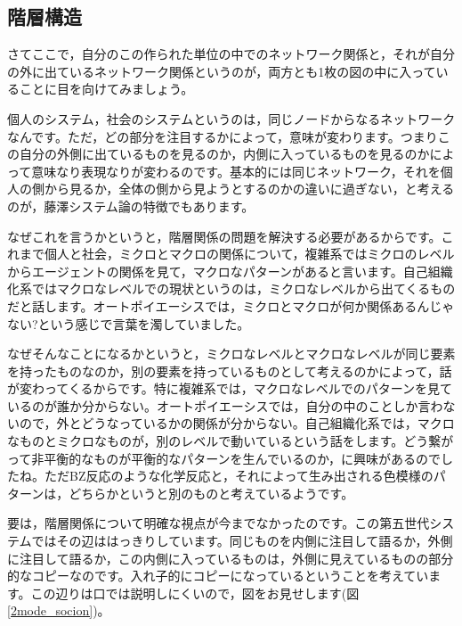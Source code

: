 \documentclass{ltjsbook}
\begin{document}
\subsection{階層構造}

さてここで，自分のこの作られた単位の中でのネットワーク関係と，それが自分の外に出ているネットワーク関係というのが，両方とも1枚の図の中に入っていることに目を向けてみましょう。

個人のシステム，社会のシステムというのは，同じノードからなるネットワークなんです。ただ，どの部分を注目するかによって，意味が変わります。つまりこの自分の外側に出ているものを見るのか，内側に入っているものを見るのかによって意味なり表現なりが変わるのです。基本的には同じネットワーク，それを個人の側から見るか，全体の側から見ようとするのかの違いに過ぎない，と考えるのが，藤澤システム論の特徴でもあります。

なぜこれを言うかというと，階層関係の問題を解決する必要があるからです。これまで個人と社会，ミクロとマクロの関係について，複雑系ではミクロのレベルからエージェントの関係を見て，マクロなパターンがあると言います。自己組織化系ではマクロなレベルでの現状というのは，ミクロなレベルから出てくるものだと話します。オートポイエーシスでは，ミクロとマクロが何か関係あるんじゃない?という感じで言葉を濁していました。

なぜそんなことになるかというと，ミクロなレベルとマクロなレベルが同じ要素を持ったものなのか，別の要素を持っているものとして考えるのかによって，話が変わってくるからです。特に複雑系では，マクロなレベルでのパターンを見ているのが誰か分からない。オートポイエーシスでは，自分の中のことしか言わないので，外とどうなっているかの関係が分からない。自己組織化系では，マクロなものとミクロなものが，別のレベルで動いているという話をします。どう繋がって非平衡的なものが平衡的なパターンを生んでいるのか，に興味があるのでしたね。ただBZ反応のような化学反応と，それによって生み出される色模様のパターンは，どちらかというと別のものと考えているようです。

要は，階層関係について明確な視点が今までなかったのです。この第五世代システムではその辺ははっきりしています。同じものを内側に注目して語るか，外側に注目して語るか，この内側に入っているものは，外側に見えているものの部分的なコピーなのです。入れ子的にコピーになっているということを考えています。この辺りは口では説明しにくいので，図をお見せします(図 \ref{2mode_socion})。
\end{document}
